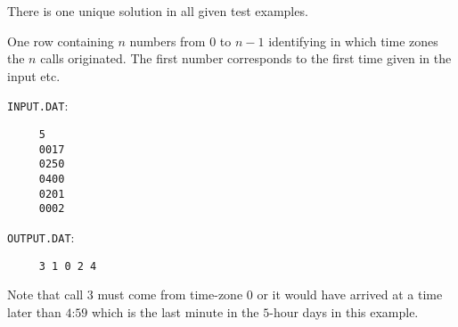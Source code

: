 There is one unique solution in all given test examples.

One row containing $n$ numbers from $0$ to $n-1$ identifying in which time zones
the $n$ calls originated. The first number corresponds to the first time
given in the input etc.


\verb|INPUT.DAT|:
\begin{verbatim}
     5
     0017
     0250
     0400
     0201
     0002
\end{verbatim}

\verb|OUTPUT.DAT|:
\begin{verbatim}
     3 1 0 2 4
\end{verbatim}


Note that call $3$ must come from time-zone $0$ or it would have arrived at a
time later than $4$:$59$ which is the last minute in the $5$-hour days in this
example.


